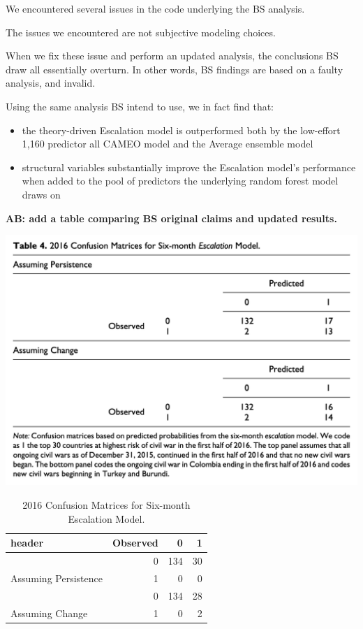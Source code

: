 \documentclass[]{article}
\providecommand{\tightlist}{%
  \setlength{\itemsep}{0pt}\setlength{\parskip}{0pt}}
\begin{document}
We encountered several issues in the code underlying the BS analysis.

The issues we encountered are not subjective modeling choices.

When we fix these issue and perform an updated analysis, the conclusions
BS draw all essentially overturn. In other words, BS findings are based
on a faulty analysis, and invalid.

Using the same analysis BS intend to use, we in fact find that:

\begin{itemize}
\tightlist
\item
  the theory-driven Escalation model is outperformed both by the
  low-effort 1,160 predictor all CAMEO model and the Average ensemble
  model
\item
  structural variables substantially improve the Escalation model's
  performance when added to the pool of predictors the underlying random
  forest model draws on
\end{itemize}

\textbf{AB: add a table comparing BS original claims and updated
results.}

\clearpage

\includegraphics{figures/bands-table4.png}

\begin{table}[t]

\caption{\label{tab:unnamed-chunk-2}2016 Confusion Matrices for Six-month Escalation Model.}
\centering
\begin{tabular}{lrrr}
\toprule
header & Observed & 0 & 1\\
\midrule
 & 0 & 134 & 30\\
\cmidrule{2-4}
\multirow{-2}{*}{\raggedright\arraybackslash Assuming Persistence} & 1 & 0 & 0\\
\cmidrule{1-4}
 & 0 & 134 & 28\\
\cmidrule{2-4}
\multirow{-2}{*}{\raggedright\arraybackslash Assuming Change} & 1 & 0 & 2\\
\bottomrule
\end{tabular}
\end{table}
\end{document}
